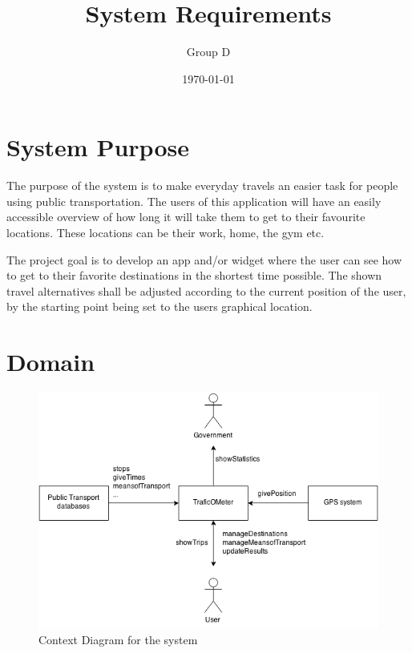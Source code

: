 \documentclass[a4paper]{article}
\title{System Requirements}
\author{Group D}
\date{\today}
\begin{document}
	\maketitle
	\thispagestyle{empty}
	\setcounter{page}{0}
	\pagebreak
	\tableofcontents
	\pagebreak
	

	\section{System Purpose} %
	The purpose of the system is to make everyday travels an easier task for people using public transportation. The users of this application will have an easily accessible overview of how long it will take them to get to their favourite locations. These locations can be their work, home, the gym etc.
	
	
The project goal is to develop an app and/or widget where the user can see how to get to their favorite destinations in the shortest time possible. The shown travel alternatives shall be adjusted according to the current position of the user, by the starting point being set to the users graphical location.
	\section{Domain}
		\begin{figure}[h]
				\includegraphics[scale=0.65]{Context-v1.png}
			\caption{Context Diagram for the system}
		\end{figure}
\end{document}
